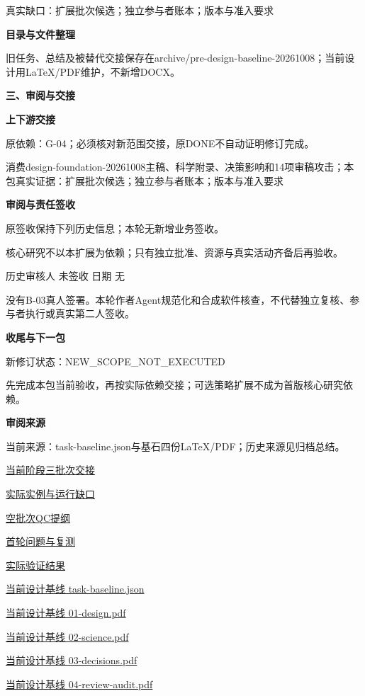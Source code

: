 \documentclass[11pt,a4paper]{article}
\newcommand{\reviewsection}[1]{\par\Needspace{5\baselineskip}\vspace{10pt}\begin{center}{\titlelatin\titlecjk\bfseries\fontsize{14}{20}\selectfont #1}\end{center}}
\newcommand{\reviewsubsection}[1]{\par\Needspace{4\baselineskip}\vspace{4pt}\begin{center}{\titlelatin\titlecjk\bfseries\fontsize{12}{18}\selectfont #1}\end{center}}
\begin{document}
真实缺口：扩展批次候选；独立参与者账本；版本与准入要求


\reviewsubsection{2.4 目录与文件整理}
旧任务、总结及被替代交接保存在archive/\allowbreak{}pre-\allowbreak{}design-\allowbreak{}baseline-\allowbreak{}20261008；当前设计用LaTeX/\allowbreak{}PDF维护，不新增DOCX。


\reviewsection{三、审阅与交接}
\reviewsubsection{3.1 上下游交接}
原依赖：G-\allowbreak{}04；必须核对新范围交接，原DONE不自动证明修订完成。


消费design-\allowbreak{}foundation-\allowbreak{}20261008主稿、科学附录、决策影响和14项审稿攻击；本包真实证据：扩展批次候选；独立参与者账本；版本与准入要求


\reviewsubsection{3.2 审阅与责任签收}
原签收保持下列历史信息；本轮无新增业务签收。


核心研究不以本扩展为依赖；只有独立批准、资源与真实活动齐备后再验收。


历史审核人 未签收    日期 无


没有B-\allowbreak{}03真人签署。本轮作者Agent规范化和合成软件核查，不代替独立复核、参与者执行或真实第二人签收。


\reviewsubsection{3.3 收尾与下一包}
新修订状态：NEW\_\allowbreak{}SCOPE\_\allowbreak{}NOT\_\allowbreak{}EXECUTED


先完成本包当前验收，再按实际依赖交接；可选策略扩展不成为首版核心研究依赖。


\reviewsubsection{3.4 审阅来源}
当前来源：task-\allowbreak{}baseline.json与基石四份LaTeX/\allowbreak{}PDF；历史来源见归档总结。


\href{file:///D:/Agent/srp/agent/tasks/B-03/outputs/current-batch.md}{当前阶段三批次交接}


\href{file:///D:/Agent/srp/agent/tasks/B-03/outputs/current-batch.json}{实际实例与运行缺口}


\href{file:///D:/Agent/srp/agent/tasks/B-03/outputs/batch-qc-template.json}{空批次QC提纲}


\href{file:///D:/Agent/srp/agent/tasks/B-03/evidence/test-fixture-fix.md}{首轮问题与复测}


\href{file:///D:/Agent/srp/agent/tasks/B-03/evidence/verification.json}{实际验证结果}


\href{file:///D:/Agent/srp/agent/design/design-foundation-20261008/task-baseline.json}{当前设计基线 task-\allowbreak{}baseline.json}


\href{file:///D:/Agent/srp/agent/design/design-foundation-20261008/01-design.pdf}{当前设计基线 01-\allowbreak{}design.pdf}


\href{file:///D:/Agent/srp/agent/design/design-foundation-20261008/02-science.pdf}{当前设计基线 02-\allowbreak{}science.pdf}


\href{file:///D:/Agent/srp/agent/design/design-foundation-20261008/03-decisions.pdf}{当前设计基线 03-\allowbreak{}decisions.pdf}


\href{file:///D:/Agent/srp/agent/design/design-foundation-20261008/04-review-audit.pdf}{当前设计基线 04-\allowbreak{}review-\allowbreak{}audit.pdf}
\end{document}
